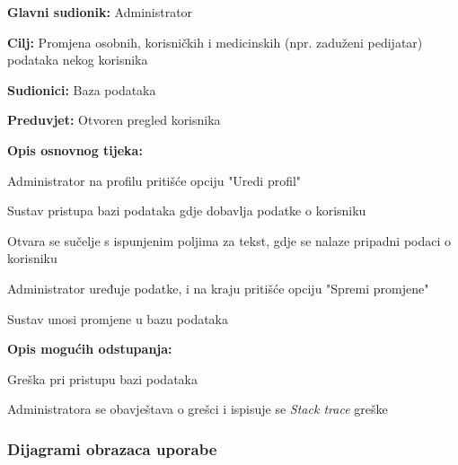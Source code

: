 					\noindent {}
					\begin{packed_item}
						
						\item \textbf{Glavni sudionik: }Administrator
						\item  \textbf{Cilj:} Promjena osobnih, korisničkih i medicinskih (npr. zaduženi pedijatar) podataka nekog korisnika
						\item  \textbf{Sudionici:} Baza podataka
						\item  \textbf{Preduvjet:} Otvoren pregled korisnika
						\item  \textbf{Opis osnovnog tijeka:}
						
						\item[] \begin{packed_enum}
							\item Administrator na profilu pritišće opciju "Uredi profil"
							\item Sustav pristupa bazi podataka gdje dobavlja podatke o korisniku
							\item Otvara se sučelje s ispunjenim poljima za tekst, gdje se nalaze pripadni podaci o korisniku
							\item Administrator uređuje podatke, i na kraju pritišće opciju "Spremi promjene"
							\item Sustav unosi promjene u bazu podataka
						\end{packed_enum}
						\item \textbf{Opis mogućih odstupanja:}
						\item[] \begin{packed_item}
							
							\item[2/5.a] Greška pri pristupu bazi podataka
							\item[] \begin{packed_enum}
								
								\item Administratora se obavještava o grešci i ispisuje se \textit{Stack trace} greške
								
							\end{packed_enum}
						\end{packed_item}
					\end{packed_item}
				
					
				\subsubsection{Dijagrami obrazaca uporabe}
					

